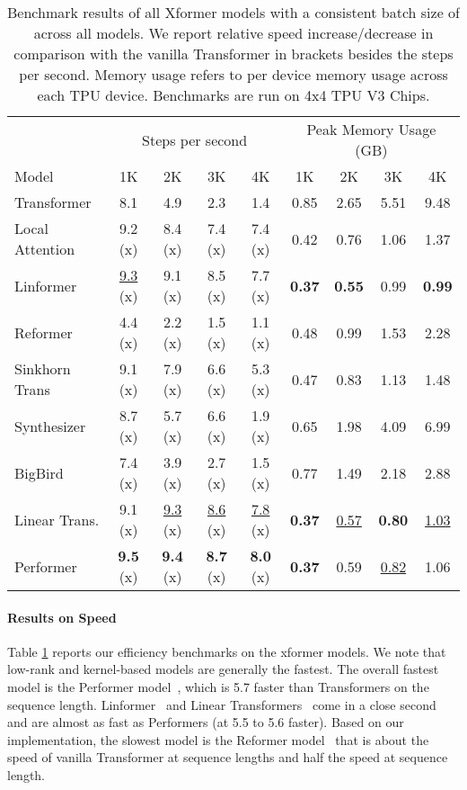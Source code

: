 \documentclass{article} \usepackage{iclr2021_conference,times}
\begin{document}
\begin{table}[t]
    \centering
    \begin{tabular}{l|cccc|cccc}
    \toprule
    & \multicolumn{4}{c|}{Steps per second} & \multicolumn{4}{c|}{Peak Memory Usage (GB)}\\ 
       Model  & 1K & 2K & 3K & 4K & 1K & 2K & 3K & 4K  \\
       \midrule
     Transformer    & 8.1 & 4.9  &2.3 & 1.4 & 0.85 & 2.65 & 5.51 & 9.48\\
     \midrule
     Local Attention & 9.2 (x)& 8.4 (x)& 7.4 (x) & 7.4 (x)& 0.42  & 0.76 & 1.06 & 1.37\\
     Linformer & \underline{9.3} (x) &  9.1 (x)& 8.5  (x)&  7.7 (x)&  \textbf{0.37} & \textbf{0.55} & 0.99 & \textbf{0.99}\\
     Reformer & 4.4 (x)&  2.2 (x)& 1.5 (x) & 1.1 (x) & 0.48 & 0.99 & 1.53 & 2.28\\
     Sinkhorn Trans & 9.1 (x) & 7.9  (x) &6.6 (x)& 5.3 (x) & 0.47 & 0.83 & 1.13 & 1.48\\ 
     Synthesizer & 8.7 (x)& 5.7 (x) & 6.6 (x) & 1.9 (x) & 0.65 & 1.98 & 4.09 & 6.99\\
     BigBird & 7.4 (x) & 3.9 (x) & 2.7 (x) & 1.5 (x) & 0.77 & 1.49 & 2.18 & 2.88\\ 
     Linear Trans. & 9.1 (x)& \underline{9.3} (x)& \underline{8.6} (x) & \underline{7.8} (x)& \textbf{0.37} & \underline{0.57} & \textbf{0.80} & \underline{1.03}\\ 
     Performer & \textbf{9.5} (x) & \textbf{9.4} (x) &   \textbf{8.7} (x) & \textbf{8.0} (x)  & \textbf{0.37}  & 0.59 & \underline{0.82} & 1.06
     \\
     \bottomrule
     
    \end{tabular}
    \caption{Benchmark results of all Xformer models with a consistent batch size of  across all models. We report relative speed increase/decrease in comparison with the vanilla Transformer in brackets besides the steps per second. Memory usage refers to per device memory usage across each TPU device. Benchmarks are run on 4x4 TPU V3 Chips.}
    \label{tab:efficiency}
\end{table}
\paragraph{Results on Speed} Table \ref{tab:efficiency} reports our efficiency benchmarks on the xformer models. We note that low-rank and kernel-based models are generally the fastest. The overall fastest model is the Performer model~\citep{choromanski2020masked}, which is 5.7 faster than Transformers on the  sequence length. Linformer~\citep{wang2020linformer} and Linear Transformers~\citep{katharopoulos2020transformers} come in a close second and are almost as fast as Performers (at 5.5 to 5.6 faster). Based on our implementation, the slowest model is the Reformer model~\citep{kitaev2020reformer} that is about  the speed of vanilla Transformer at  sequence lengths and half the speed at  sequence length.
\end{document}
